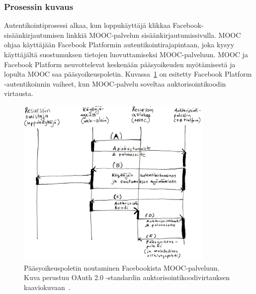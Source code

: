 \documentclass[finnish,gradu]{tktltiki}
\begin{document}
  \subsubsection{Prosessin kuvaus} %
  \label{ssub:autentikoinnin_vaiheet_facebook_platform_palveluun}

  Autentikointiprosessi alkaa, kun loppukäyttäjä klikkaa Facebook-sisäänkirjautumisen linkkiä MOOC-palvelun sisäänkirjautumissivulla. MOOC ohjaa käyttäjään Facebook Platformin autentikointirajapintaan, joka kysyy käyttäjältä suostumuksen tietojen luovuttamiseksi MOOC-palveluun. MOOC ja Facebook Platform neuvottelevat keskenään pääsyoikeuden myötämisestä ja lopulta MOOC saa pääsyoikeuspoletin. Kuvassa~\ref{fig:oauth_auth_code_flow} on esitetty Facebook Platform -autentikoinnin vaiheet, kun MOOC-palvelu soveltaa auktorisointikoodin virtausta.

  \begin{figure}[h!]
    \centering
    \includegraphics[width=0.85\textwidth]{images/fb_auth_sekvenssi.jpg}
    \caption{Pääsyoikeuspoletin noutaminen Facebookista MOOC-palveluun. Kuva perustuu OAuth 2.0 -standardin auktorisointikoodivirtauksen kaaviokuvaan~\cite{ietf_oauth2}.}
    \label{fig:oauth_auth_code_flow}
  \end{figure}
\end{document}

